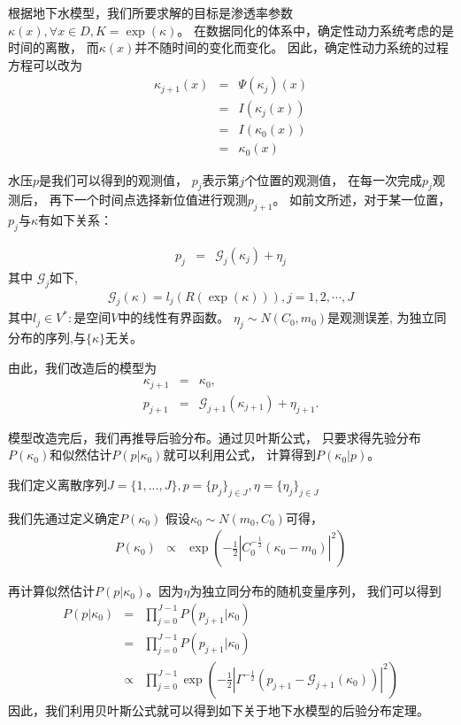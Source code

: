 \documentclass[a4paper,12pt,oneside,CJK]{cctbook}
\theoremstyle{definition}
\numberwithin{equation}{section}
\begin{document}
根据地下水模型，我们所要求解的目标是渗透率参数$\kappa(x),\forall x\in D,K=\exp(\kappa)$。
在数据同化的体系中，确定性动力系统考虑的是时间的离散，
而$\kappa(x)$并不随时间的变化而变化。
因此，确定性动力系统的过程方程可以改为
\begin{eqnarray*}
   \kappa_{j+1}(x)&=&\Psi(\kappa_j)(x)\\
          &=&I(\kappa_j(x))\\
          &=&I(\kappa_0(x))\\
          &=&\kappa_0(x)
\end{eqnarray*}

水压$p$是我们可以得到的观测值，
$p_j$表示第$j$个位置的观测值，
在每一次完成$p_j$观测后，
再下一个时间点选择新位值进行观测$p_{j+1}$。
如前文所述，对于某一位置，$p_j$与$\kappa$有如下关系：

\begin{eqnarray*}
p_j&=&\mathcal{G}_j(\kappa_j)+\eta_j
\end{eqnarray*}
其中
$\mathcal{G}_j$如下,
\begin{eqnarray*}
   \mathcal{G}_j(\kappa)=l_j(R(\exp(\kappa))),j=1,2,\cdots,J
\end{eqnarray*}
其中$l_j\in V^*:$是空间$V$中的线性有界函数。
$\eta_j\sim N(C_0,m_0)$是观测误差,
为独立同分布的序列,与$\{\kappa\}$无关。

由此，我们改造后的模型为
\begin{eqnarray*}
    \kappa_{j+1}&=&\kappa_0,\\
    p_{j+1}&=&\mathcal{G}_{j+1}(\kappa_{j+1})+\eta _{j+1}.
\end{eqnarray*}

模型改造完后，我们再推导后验分布。通过贝叶斯公式，
只要求得先验分布$P(\kappa_0)$和似然估计$P(p|\kappa_0)$就可以利用公式，
计算得到$P(\kappa_0|p)$。

我们定义离散序列$J=\{1,...,J\},
p=\{p_j\}_{j\in J},\eta=\{\eta_j\}_{j\in J}$

我们先通过定义确定$P(\kappa_0)$
假设$\kappa_0\sim N(m_0, C_0)$可得，
\begin{eqnarray*}
   P(\kappa_0)&\propto& \exp(-\frac{1}{2}|C_0^{-\frac{1}{2}}(\kappa_0-m_0)|^2)
\end{eqnarray*}

再计算似然估计$P(p|\kappa_0)$。因为$\eta$为独立同分布的随机变量序列，
我们可以得到
\begin{eqnarray*}
   P(p|\kappa_0)&=&\prod_{j=0}^{J-1}P(p_{j+1}|\kappa_0)\\
           &=&\prod_{j=0}^{J-1}P(p_{j+1}|\kappa_0)\\
           &\propto& \prod_{j=0}^{J-1}\exp(-\frac{1}{2}|\Gamma^{-\frac{1}{2}}(p_{j+1}-\mathcal{G}_{j+1}(\kappa_0))|^2)
\end{eqnarray*}
因此，我们利用贝叶斯公式就可以得到如下关于地下水模型的后验分布定理。
\end{document}
